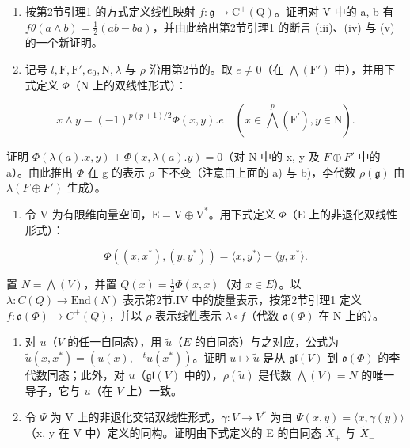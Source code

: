 \begin{enumerate}
\def\labelenumi{\alph{enumi})}
\setcounter{enumi}{1}
\item
  按第2节引理1 的方式定义线性映射 \(f: \mathfrak{g} \to \mathrm{C}^{+}(\mathrm{Q})\)。证明对 V 中的 a, b 有 \(f\theta(a \wedge b) = \frac{1}{2}(ab - ba)\)，并由此给出第2节引理1 的断言 (iii)、(iv) 与 (v) 的一个新证明。
\item
  记号 \(l, \mathrm{F}, \mathrm{F}', e_0, \mathrm{N}, \lambda\) 与 \(\rho\) 沿用第2节的。取 \(e \neq 0\)（在 \(\bigwedge (\mathrm{F}')\) 中），并用下式定义 \(\varPhi\)（\(\mathrm{N}\) 上的双线性形式）：
\end{enumerate}

\[
x \wedge y = (- 1) ^ {p (p + 1) / 2} \Phi (x, y). e \quad (x \in \bigwedge^ {p} (\mathrm{F} ^ {\prime}), y \in \mathrm{N}).
\]

证明 \(\Phi(\lambda(a).x,y)+\Phi(x,\lambda(a).y)=0\)（对 N 中的 x, y 及 \(F\oplus F'\) 中的 a）。由此推出 \(\Phi\) 在 g 的表示 \(\rho\) 下不变（注意由上面的 a) 与 b)，李代数 \(\rho(\mathfrak{g})\) 由 \(\lambda(F\oplus F')\) 生成）。

\begin{enumerate}
\def\labelenumi{\arabic{enumi})}
\setcounter{enumi}{18}
\tightlist
\item
  令 \(\mathrm{V}\) 为有限维向量空间，\(\mathrm{E} = \mathrm{V} \oplus \mathrm{V}^*\)。用下式定义 \(\varPhi\)（\(\mathrm{E}\) 上的非退化双线性形式）：
\end{enumerate}

\[
\Phi ((x, x ^ {*}), (y, y ^ {*})) = \langle x, y ^ {*} \rangle + \langle y, x ^ {*} \rangle .
\]

置 \(N = \bigwedge(V)\)，并置 \(Q(x) = \frac{1}{2}\Phi(x, x)\)（对 \(x \in E\)）。以 \(\lambda : C(Q) \to \text{End}(N)\) 表示第2节.IV 中的旋量表示，按第2节引理1 定义 \(f : \mathfrak{o}(\Phi) \to C^{+}(Q)\)，并以 \(\rho\) 表示线性表示 \(\lambda \circ f\)（代数 \(\mathfrak{o}(\Phi)\) 在 N 上的）。

\begin{enumerate}
\def\labelenumi{\alph{enumi})}
\item
  对 \(u\)（\(V\) 的任一自同态），用 \(\tilde{u}\)（\(E\) 的自同态）与之对应，公式为 \(\tilde{u}(x, x^{*}) = (u(x), -^{t}u(x^{*}))\)。证明 \(u \mapsto \tilde{u}\) 是从 \(\mathfrak{gl}(V)\) 到 \(\mathfrak{o}(\varPhi)\) 的李代数同态；此外，对 \(u\)（\(\mathfrak{gl}(V)\) 中的），\(\rho(\tilde{u})\) 是代数 \(\bigwedge(V) = N\) 的唯一导子，它与 \(u\)（在 \(V\) 上）一致。
\item
  令 \(\varPsi\) 为 V 上的非退化交错双线性形式，\(\gamma: V \to V^{*}\) 为由 \(\varPsi(x, y) = \langle x, \gamma(y) \rangle\)（x, y 在 V 中）定义的同构。证明由下式定义的 E 的自同态 \(\tilde{X}_{+}\) 与 \(\tilde{X}_{-}\)
\end{enumerate}

